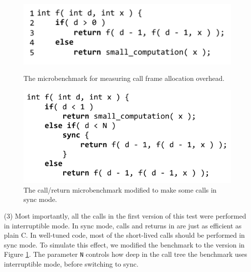 \documentclass[a4paper,UKenglish,cleveref, autoref]{lipics-v2019}
\begin{document}
\begin{figure}
    \centering
    \begin{minipage}[t]{0.47\textwidth}
        \centering
        \includegraphics[width=1.0\textwidth]{Code/just_calling_benchmark}
        \caption{The microbenchmark for measuring call frame allocation overhead.}
        \label{fig:micro_calling}
    \end{minipage}\hfill
    \begin{minipage}[t]{0.47\textwidth}
        \centering
        \includegraphics[width=1.0\textwidth]{Code/just_calling_n_benchmark}
        \caption{The call{\slash}return microbenchmark modified to make some calls in sync mode.}
        \label{fig:micro_calling_n}
    \end{minipage}
\end{figure}

(3) Most importantly, all the calls in the first version of this test were performed in interruptible mode.
In sync mode, calls and returns in \charcoal{} are just as efficient as plain C.
In well-tuned \charcoal{} code, most of the short-lived calls should be performed in sync mode.
To simulate this effect, we modified the benchmark to the version in Figure \ref{fig:micro_calling_n}.
The parameter \texttt{N} controls how deep in the call tree the benchmark uses interruptible mode, before switching to sync.
\end{document}
